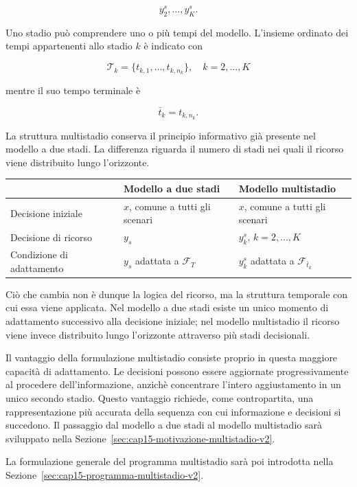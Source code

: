 \[
y_2^s,\ldots,y_K^s.
\]

Uno stadio pu\`o comprendere uno o pi\`u tempi del modello. L'insieme ordinato
dei tempi appartenenti allo stadio $k$ \`e indicato con

\[
\mathcal T_k
=
\{t_{k,1},\ldots,t_{k,n_k}\}, \quad k=2,...,K
\] 

mentre il suo tempo terminale \`e

\[
\bar t_k
=
t_{k,n_k}.
\]

La struttura multistadio conserva il principio informativo gi\`a presente
nel modello a due stadi. La differenza riguarda il numero di stadi nei quali
il ricorso viene distribuito lungo l'orizzonte.

\begin{center}
\begin{tabular}{|p{2.8cm}|p{3.7cm}|p{3.7cm}|}
\hline
 & \textbf{Modello a due stadi} & \textbf{Modello multistadio} \\
\hline
\raggedright Decisione iniziale
&
$x$, comune a tutti gli scenari
&
$x$, comune a tutti gli scenari
\\
\hline
\raggedright Decisione di ricorso
&
$y_s$
&
$y_k^s$, \quad $k=2,\ldots,K$
\\
\hline
\raggedright Condizione di adattamento
&
$y_s$ adattata a $\mathcal F_T$
&
$y_k^s$ adattata a $\mathcal F_{\bar t_k}$
\\
\hline
\end{tabular}
\end{center}

Ci\`o che cambia non \`e dunque la logica del ricorso, ma la struttura
temporale con cui essa viene applicata. Nel modello a due stadi esiste un
unico momento di adattamento successivo alla decisione iniziale; nel modello
multistadio il ricorso viene invece distribuito lungo l'orizzonte attraverso
pi\`u stadi decisionali.

Il vantaggio della formulazione multistadio consiste proprio in questa
maggiore capacit\`a di adattamento. Le decisioni possono essere aggiornate
progressivamente al procedere dell'informazione, anzich\`e concentrare
l'intero aggiustamento in un unico secondo stadio. Questo vantaggio richiede,
come contropartita, una rappresentazione pi\`u accurata della sequenza con cui
informazione e decisioni si succedono. Il passaggio dal modello a due stadi
al modello multistadio sar\`a sviluppato nella
Sezione~\ref{sec:cap15-motivazione-multistadio-v2}.

La formulazione generale del programma multistadio sar\`a poi introdotta
nella Sezione~\ref{sec:cap15-programma-multistadio-v2}.

